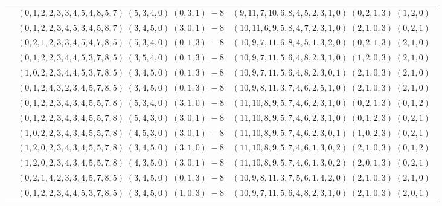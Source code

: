 \documentclass[11pt]{article}
\begin{document}
\begin{longtable}[l]{|c|c|c|}
 \cline{2-3} 
 & $(0 ,1 ,2 ,2 ,3 ,3 ,4 ,5 ,4 ,8 ,5 ,7) \;(5 ,3 ,4 ,0) \;(0 ,3 ,1) \;-8$ & $(9 ,11 ,7 ,10 ,6 ,8 ,4 ,5 ,2 ,3 ,1 ,0) \;(0 ,2 ,1 ,3) \;(1 ,2 ,0) \;$\\ 
 \cline{2-3} 
 & $(0 ,1 ,2 ,2 ,3 ,4 ,5 ,3 ,4 ,5 ,8 ,7) \;(3 ,4 ,5 ,0) \;(3 ,0 ,1) \;-8$ & $(10 ,11 ,6 ,9 ,5 ,8 ,4 ,7 ,2 ,3 ,1 ,0) \;(2 ,1 ,0 ,3) \;(0 ,2 ,1) \;$\\ 
 \cline{2-3} 
 & $(0 ,2 ,1 ,2 ,3 ,3 ,4 ,5 ,4 ,7 ,8 ,5) \;(5 ,3 ,4 ,0) \;(0 ,1 ,3) \;-8$ & $(10 ,9 ,7 ,11 ,6 ,8 ,4 ,5 ,1 ,3 ,2 ,0) \;(0 ,2 ,1 ,3) \;(2 ,1 ,0) \;$\\ 
 \cline{2-3} 
 & $(0 ,1 ,2 ,2 ,3 ,4 ,4 ,5 ,3 ,7 ,8 ,5) \;(3 ,5 ,4 ,0) \;(0 ,1 ,3) \;-8$ & $(10 ,9 ,7 ,11 ,5 ,6 ,4 ,8 ,2 ,3 ,1 ,0) \;(1 ,2 ,0 ,3) \;(2 ,1 ,0) \;$\\ 
 \cline{2-3} 
 & $(1 ,0 ,2 ,2 ,3 ,4 ,4 ,5 ,3 ,7 ,8 ,5) \;(3 ,4 ,5 ,0) \;(0 ,1 ,3) \;-8$ & $(10 ,9 ,7 ,11 ,5 ,6 ,4 ,8 ,2 ,3 ,0 ,1) \;(2 ,1 ,0 ,3) \;(2 ,1 ,0) \;$\\ 
 \cline{2-3} 
 & $(0 ,1 ,2 ,4 ,3 ,2 ,3 ,4 ,5 ,7 ,8 ,5) \;(3 ,4 ,5 ,0) \;(0 ,1 ,3) \;-8$ & $(10 ,9 ,8 ,11 ,3 ,7 ,4 ,6 ,2 ,5 ,1 ,0) \;(2 ,1 ,0 ,3) \;(2 ,1 ,0) \;$\\ 
 \cline{2-3} 
 & $(0 ,1 ,2 ,2 ,3 ,4 ,3 ,4 ,5 ,5 ,7 ,8) \;(5 ,3 ,4 ,0) \;(3 ,1 ,0) \;-8$ & $(11 ,10 ,8 ,9 ,5 ,7 ,4 ,6 ,2 ,3 ,1 ,0) \;(0 ,2 ,1 ,3) \;(0 ,1 ,2) \;$\\ 
 \cline{2-3} 
 & $(0 ,1 ,2 ,2 ,3 ,4 ,3 ,4 ,5 ,5 ,7 ,8) \;(5 ,4 ,3 ,0) \;(3 ,0 ,1) \;-8$ & $(11 ,10 ,8 ,9 ,5 ,7 ,4 ,6 ,2 ,3 ,1 ,0) \;(0 ,1 ,2 ,3) \;(0 ,2 ,1) \;$\\ 
 \cline{2-3} 
 & $(1 ,0 ,2 ,2 ,3 ,4 ,3 ,4 ,5 ,5 ,7 ,8) \;(4 ,5 ,3 ,0) \;(3 ,0 ,1) \;-8$ & $(11 ,10 ,8 ,9 ,5 ,7 ,4 ,6 ,2 ,3 ,0 ,1) \;(1 ,0 ,2 ,3) \;(0 ,2 ,1) \;$\\ 
 \cline{2-3} 
 & $(1 ,2 ,0 ,2 ,3 ,4 ,3 ,4 ,5 ,5 ,7 ,8) \;(3 ,4 ,5 ,0) \;(3 ,1 ,0) \;-8$ & $(11 ,10 ,8 ,9 ,5 ,7 ,4 ,6 ,1 ,3 ,0 ,2) \;(2 ,1 ,0 ,3) \;(0 ,1 ,2) \;$\\ 
 \cline{2-3} 
 & $(1 ,2 ,0 ,2 ,3 ,4 ,3 ,4 ,5 ,5 ,7 ,8) \;(4 ,3 ,5 ,0) \;(3 ,0 ,1) \;-8$ & $(11 ,10 ,8 ,9 ,5 ,7 ,4 ,6 ,1 ,3 ,0 ,2) \;(2 ,0 ,1 ,3) \;(0 ,2 ,1) \;$\\ 
 \cline{2-3} 
 & $(0 ,2 ,1 ,4 ,2 ,3 ,3 ,4 ,5 ,7 ,8 ,5) \;(3 ,4 ,5 ,0) \;(0 ,1 ,3) \;-8$ & $(10 ,9 ,8 ,11 ,3 ,7 ,5 ,6 ,1 ,4 ,2 ,0) \;(2 ,1 ,0 ,3) \;(2 ,1 ,0) \;$\\ 
 \cline{2-3} 
 & $(0 ,1 ,2 ,2 ,3 ,4 ,4 ,5 ,3 ,7 ,8 ,5) \;(3 ,4 ,5 ,0) \;(1 ,0 ,3) \;-8$ & $(10 ,9 ,7 ,11 ,5 ,6 ,4 ,8 ,2 ,3 ,1 ,0) \;(2 ,1 ,0 ,3) \;(2 ,0 ,1) \;$\\ 

\end{longtable}
\end{document}

